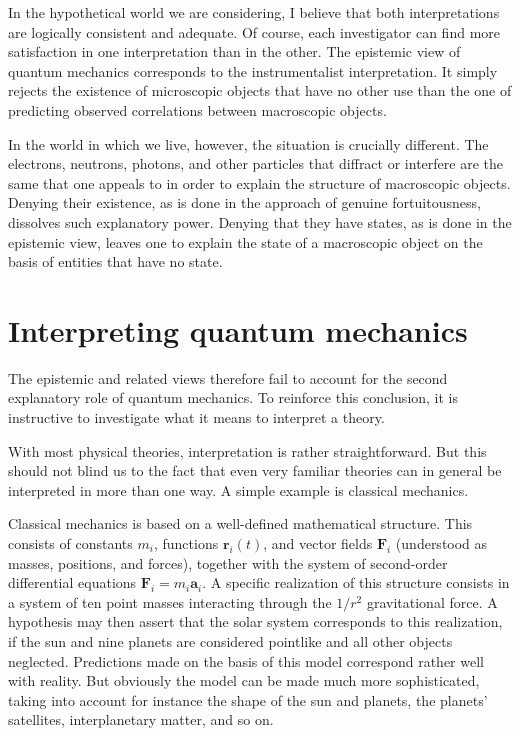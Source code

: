 \documentclass[12pt]{article}
\begin{document}
In the hypothetical world we are considering,
I believe that both interpretations
are logically consistent and adequate.
Of course, each investigator can find more satisfaction
in one interpretation than in the other.  The
epistemic view of quantum mechanics corresponds to the
instrumentalist interpretation.  It
simply rejects the existence of
microscopic objects that have no other use
than the one of predicting observed
correlations between macroscopic objects.

In the world in which we live, however, the
situation is crucially different.  The electrons,
neutrons, photons, and other particles that diffract
or interfere are the same that one appeals to in
order to explain the structure of macroscopic objects.
Denying their existence, as is done in the approach
of genuine fortuitousness, dissolves such
explanatory power.  Denying that they
have states, as is done in the epistemic view, leaves
one to explain the state of a macroscopic object
on the basis of entities that have no state.
%
\section{Interpreting quantum mechanics}
%
The epistemic and related views therefore fail
to account for the second explanatory role of
quantum mechanics.  To reinforce this conclusion,
it is instructive to investigate what it means
to interpret a theory.

With most physical theories, interpretation is rather
straightforward.  But this should not blind us to the
fact that even very familiar theories can in general
be interpreted in more than one way.  A simple
example is classical mechanics.

Classical mechanics is based on a well-defined mathematical
structure.  This consists of constants $m_i$, functions
$\mathbf{r}_i (t)$, and vector fields $\mathbf{F}_i$
(understood as masses, positions, and forces),
together with the system of second-order differential
equations $\mathbf{F}_i = m_i \mathbf{a}_i$.  A
specific realization of this structure consists in
a system of ten point masses
interacting through the $1/r^2$ gravitational
force.  A hypothesis may then
assert that the solar system corresponds to
this realization, if the sun and nine planets are
considered pointlike and all other objects
neglected.  Predictions made on the basis of
this model correspond rather well with reality.
But obviously the model can be made much more
sophisticated, taking into account for instance
the shape of the sun and planets, the planets'
satellites, interplanetary matter, and so on. 
\end{document}
